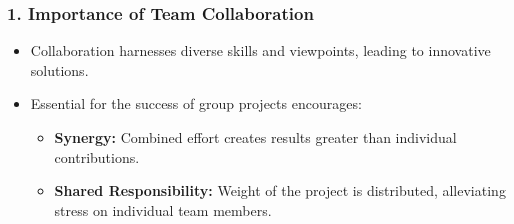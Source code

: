 \documentclass[aspectratio=169]{beamer}
\begin{document}
\begin{frame}[fragile]
    \frametitle{1. Importance of Team Collaboration}
    \begin{itemize}
        \item Collaboration harnesses diverse skills and viewpoints, leading to innovative solutions.
        \item Essential for the success of group projects encourages:
        \begin{itemize}
            \item \textbf{Synergy:} Combined effort creates results greater than individual contributions.
            \item \textbf{Shared Responsibility:} Weight of the project is distributed, alleviating stress on individual team members.
        \end{itemize}
    \end{itemize}
\end{frame}
\end{document}
